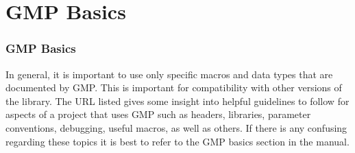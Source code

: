 
\section{GMP Basics}

\begin{frame}
\frametitle{GMP Basics}

\medskip

In general, it is important to use only specific macros and
data types that are documented by GMP. This is important for
compatibility with other versions of the library. The URL
listed gives some insight into helpful guidelines to follow
for aspects of a project that uses GMP such as headers,
libraries, parameter conventions, debugging, useful macros,
as well as others. If there is any confusing regarding these
topics it is best to refer to the GMP basics section in the
manual.
\end{frame}

